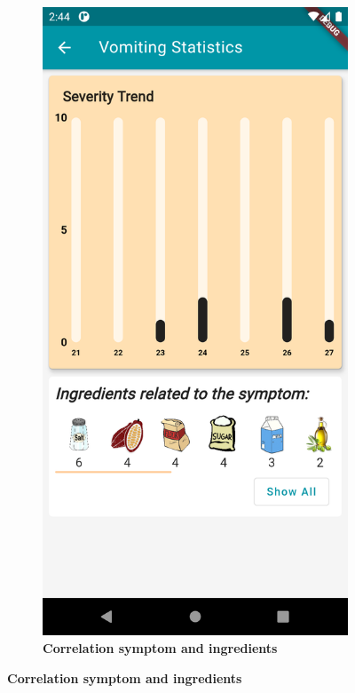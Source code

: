 \documentclass [12pt]{article}
\begin{document}
\begin{description}[leftmargin=1cm,rightmargin=1cm]
\begin{figure}[h!]
\begin{subfigure}[tr]{0.3\linewidth}
\includegraphics[width=\linewidth]{statistics3.PNG}
\caption{\textbf{Correlation symptom and ingredients}}
\end{subfigure}

\end{figure}
\end{description}
\end{document}
